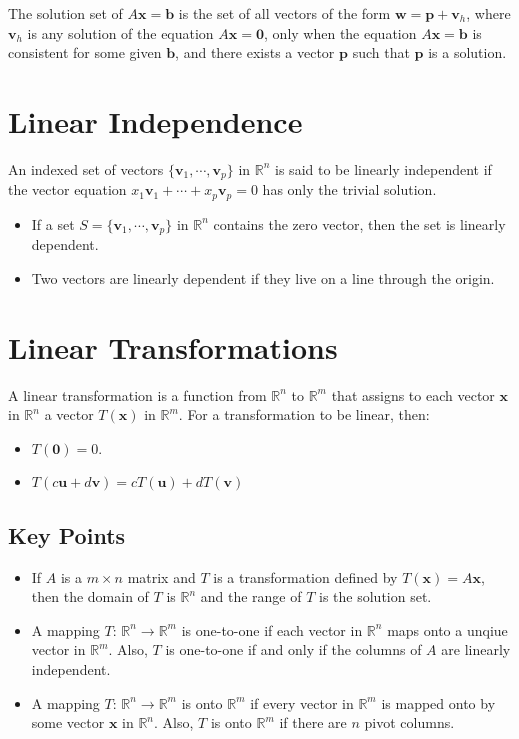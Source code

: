 \documentclass{article}
\begin{document}
The solution set of $A\mathbf{x}=\mathbf{b}$ is the set of all vectors of the form
$\mathbf{w}=\mathbf{p}+\mathbf{v}_h$, where $\mathbf{v}_h$ is any solution of the equation
$A\mathbf{x}=\mathbf{0}$, only when the equation $A\mathbf{x}=\mathbf{b}$ is consistent for some
given $\mathbf{b}$, and there exists a vector $\mathbf{p}$ such that $\mathbf{p}$ is a solution.

\section*{Linear Independence}
An indexed set of vectors $\{\mathbf{v}_1,\cdots,\mathbf{v}_p\}$ in $\mathbb{R}^n$ is said to be
linearly independent if the vector equation $x_1\mathbf{v}_1+\cdots + x_p\mathbf{v}_p=0$ has only
the trivial solution.
\begin{itemize}
    \item If a set $S=\{\mathbf{v}_1,\cdots, \mathbf{v}_p\}$ in $\mathbb{R}^n$ contains the zero
    vector, then the set is linearly dependent.
    \item Two vectors are linearly dependent if they live on a line through the origin.
\end{itemize}

\section*{Linear Transformations}
A linear transformation is a function from $\mathbb{R}^n$ to $\mathbb{R}^m$ that assigns to each
vector $\mathbf{x}$ in $\mathbb{R}^n$ a vector $T(\mathbf{x})$ in $\mathbb{R}^m$. For a
transformation to be linear, then:
\begin{itemize}
    \item $T(\mathbf{0})=0$.
    \item $T(c\mathbf{u}+d\mathbf{v})=cT(\mathbf{u})+dT(\mathbf{v})$
\end{itemize}

\subsection*{Key Points}
\begin{itemize}
    \item If $A$ is a $m\times n$ matrix and $T$ is a transformation defined by
    $T(\mathbf{x})=A\mathbf{x}$, then the domain of $T$ is $\mathbb{R}^n$ and the range of $T$ is
    the solution set.
    \item A mapping $T$: $\mathbb{R}^n\rightarrow\mathbb{R}^m$ is one-to-one if each vector in
    $\mathbb{R}^n$ maps onto a unqiue vector in $\mathbb{R}^m$. Also, $T$ is one-to-one if and only
    if the columns of $A$ are linearly independent.
    \item A mapping $T$: $\mathbb{R}^n\rightarrow\mathbb{R}^m$ is onto $\mathbb{R}^m$ if every
    vector in $\mathbb{R}^m$ is mapped onto by some vector $\mathbf{x}$ in $\mathbb{R}^n$. Also,
    $T$ is onto $\mathbb{R}^m$ if there are $n$ pivot columns.
\end{itemize}
\end{document}
